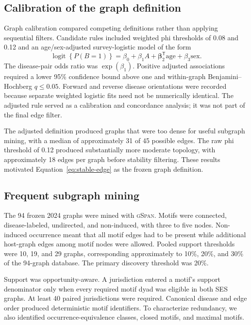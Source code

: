 \documentclass[11pt]{article}
\newcommand{\gspan}{\textsc{gSpan}}
\begin{document}
\subsection{Calibration of the graph definition}

Graph calibration compared competing definitions rather than applying
sequential filters. Candidate rules included weighted phi thresholds of 0.08
and 0.12 and an age/sex-adjusted survey-logistic model of the form
\begin{equation}
  \operatorname{logit}\!\left\{P(B=1)\right\}
  =
  \beta_0+\beta_1 A+\boldsymbol{\beta}_2^\mathsf{T}\mathrm{age}
  +\beta_3\mathrm{sex}.
\end{equation}
The disease-pair odds ratio was $\exp(\beta_1)$. Positive adjusted
associations required a lower 95\% confidence bound above one and
within-graph Benjamini--Hochberg $q\le 0.05$. Forward and reverse disease
orientations were recorded because separate weighted logistic fits need not
be numerically identical. The adjusted rule served as a calibration and
concordance analysis; it was not part of the final edge filter.

The adjusted definition produced graphs that were too dense for useful
subgraph mining, with a median of approximately 31 of 45 possible edges.
The raw phi threshold of 0.12 produced substantially more moderate topology,
with approximately 18 edges per graph before stability filtering. These
results motivated Equation~\ref{eq:stable-edge} as the frozen graph
definition.

\subsection{Frequent subgraph mining}

The 94 frozen 2024 graphs were mined with \gspan. Motifs were connected,
disease-labeled, undirected, and non-induced, with three to five nodes.
Non-induced occurrence meant that all motif edges had to be present while
additional host-graph edges among motif nodes were allowed. Pooled support
thresholds were 10, 19, and 29 graphs, corresponding approximately to 10\%,
20\%, and 30\% of the 94-graph database. The primary discovery threshold was
20\%.

Support was opportunity-aware. A jurisdiction entered a motif's support
denominator only when every required motif dyad was eligible in both SES
graphs. At least 40 paired jurisdictions were required. Canonical disease and
edge order produced deterministic motif identifiers. To characterize
redundancy, we also identified occurrence-equivalence classes, closed motifs,
and maximal motifs.
\end{document}
